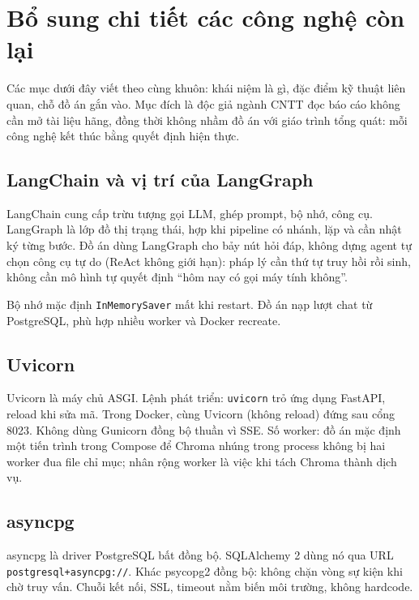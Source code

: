 
\section{Bổ sung chi tiết các công nghệ còn lại}

Các mục dưới đây viết theo cùng khuôn: khái niệm là gì, đặc điểm kỹ thuật liên
quan, chỗ đồ án gắn vào. Mục đích là độc giả ngành CNTT đọc báo cáo không cần
mở tài liệu hãng, đồng thời không nhầm đồ án với giáo trình tổng quát: mỗi
công nghệ kết thúc bằng quyết định hiện thực.

\subsection{LangChain và vị trí của LangGraph}

LangChain cung cấp trừu tượng gọi LLM, ghép prompt, bộ nhớ, công cụ. LangGraph
là lớp đồ thị trạng thái, hợp khi pipeline có nhánh, lặp và cần nhật ký từng
bước. Đồ án dùng LangGraph cho bảy nút hỏi đáp, không dựng agent tự chọn công
cụ tự do (ReAct không giới hạn): pháp lý cần thứ tự truy hồi rồi sinh, không
cần mô hình tự quyết định ``hôm nay có gọi máy tính không''.

Bộ nhớ mặc định \texttt{InMemorySaver} mất khi restart. Đồ án nạp lượt chat từ
PostgreSQL, phù hợp nhiều worker và Docker recreate.

\subsection{Uvicorn}

Uvicorn là máy chủ ASGI. Lệnh phát triển: \texttt{uvicorn} trỏ ứng dụng FastAPI,
reload khi sửa mã. Trong Docker, cùng Uvicorn (không reload) đứng sau cổng 8023.
Không dùng Gunicorn đồng bộ thuần vì SSE. Số worker: đồ án mặc định một tiến
trình trong Compose để Chroma nhúng trong process không bị hai worker đua file
chỉ mục; nhân rộng worker là việc khi tách Chroma thành dịch vụ.

\subsection{asyncpg}

asyncpg là driver PostgreSQL bất đồng bộ. SQLAlchemy 2 dùng nó qua URL
\texttt{postgresql+asyncpg://}. Khác psycopg2 đồng bộ: không chặn vòng sự kiện
khi chờ truy vấn. Chuỗi kết nối, SSL, timeout nằm biến môi trường, không hardcode.


